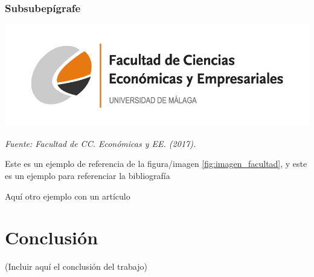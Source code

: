 \documentclass[12pt,a4paper]{report}
\numberwithin{figure}{section} %
\numberwithin{table}{section} %
\begin{document}
\subsubsection*{Subsubepígrafe} 

\begin{center}
    \centering
    \includegraphics[width=\linewidth]{logo.png} %
    \label{fig:imagen_facultad} %
    \par %
    \raggedright %
    \textit{Fuente: Facultad de CC. Económicas y EE. (2017).}
\end{center}

Este es un ejemplo de referencia de la figura/imagen \ref{fig:imagen_facultad}, y este es un ejemplo para referenciar la bibliografía \citep{tfg_sample}

\vspace{12pt}

Aquí otro ejemplo con un artículo \citep{baccini2007edgeworth}

\vspace{12pt}

\section{Conclusión} 

\vspace{12pt}

(Incluir aquí el conclusión del trabajo)



 
 
\end{document}
